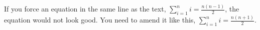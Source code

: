 \documentclass[10pt, a4paper]{article}
\begin{document}
If you force an equation in the same line as the text, $ \sum_{i=1}^{n} i= \frac{n(n-1)}{2}$, the equation would not look good. You need to amend it like this, $\displaystyle \sum_{i=1}^{n} i=\frac{n(n+1)}{2}$.
\end{document}
